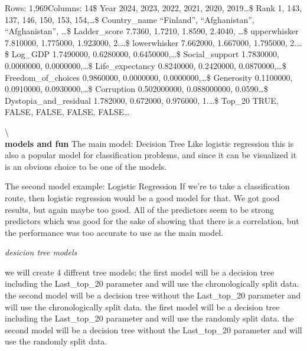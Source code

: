 \documentclass[
]{article}
\begin{document}
Rows: 1,969\newline   Columns: 14\newline   \$ Year 2024, 2023, 2022,
2021, 2020, 2019\ldots{}\newline   \$ Rank 1, 143, 137, 146, 150, 153,
154,\ldots{}\newline   \$ Country\_name ``Finland'', ``Afghanistan'',
``Afghanistan'', \ldots{}\newline   \$ Ladder\_score 7.7360, 1.7210,
1.8590, 2.4040, \ldots{}\newline   \$ upperwhisker 7.810000, 1.775000,
1.923000, 2.\ldots{}\newline   \$ lowerwhisker 7.662000, 1.667000,
1.795000, 2.\ldots{}\newline   \$ Log\_GDP 1.7490000, 0.6280000,
0.6450000,\ldots{}\newline   \$ Social\_support 1.7830000, 0.0000000,
0.0000000,\ldots{}\newline   \$ Life\_expectancy 0.8240000, 0.2420000,
0.0870000,\ldots{}\newline   \$ Freedom\_of\_choices 0.9860000,
0.0000000, 0.0000000,\ldots{}\newline   \$ Generosity 0.1100000,
0.0910000, 0.0930000,\ldots{}\newline   \$ Corruption 0.502000000,
0.088000000, 0.0590\ldots{}\newline \$ Dystopia\_and\_residual 1.782000,
0.672000, 0.976000, 1.\ldots{}\newline   \$ Top\_20 TRUE, FALSE, FALSE,
FALSE, FALSE\ldots{}\newline  

\textbackslash{}\\
\textbf{models and fun} The main model: Decision Tree Like logistic
regression this is also a popular model for classification problems, and
since it can be visualized it is an obvious choice to be one of the
models.

The second model example: Logistic Regression If we're to take a
classification route, then logistic regression would be a good model for
that. We got good results, but again maybe too good. All of the
predictors seem to be strong predictors which was good for the sake of
showing that there is a correlation, but the performance was too
accurate to use as the main model.

\emph{desicion tree models}

we will create 4 diffrent tree models: the first model will be a
decision tree including the Last\_top\_20 parameter and will use the
chronologically split data. the second model will be a decision tree
without the Last\_top\_20 parameter and will use the chronologically
split data. the first model will be a decision tree including the
Last\_top\_20 parameter and will use the randomly split data. the second
model will be a decision tree without the Last\_top\_20 parameter and
will use the randomly split data.
\end{document}

